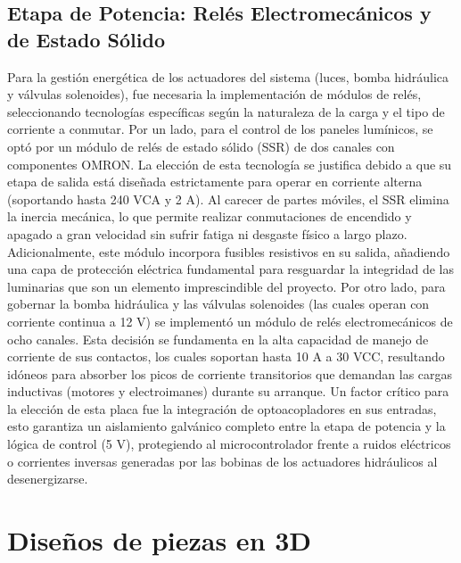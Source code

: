 \subsection{Etapa de Potencia: Relés Electromecánicos y de Estado Sólido}
Para la gestión energética de los actuadores del sistema (luces, bomba hidráulica y válvulas solenoides), fue necesaria la implementación de módulos de relés, seleccionando tecnologías específicas según la naturaleza de la carga y el tipo de corriente a conmutar.
Por un lado, para el control de los paneles lumínicos, se optó por un módulo de relés de estado sólido (SSR) de dos canales con componentes OMRON. La elección de esta tecnología se justifica debido a que su etapa de salida está diseñada estrictamente para operar en corriente alterna (soportando hasta 240 VCA y 2 A). Al carecer de partes móviles, el SSR elimina la inercia mecánica, lo que permite realizar conmutaciones de encendido y apagado a gran velocidad sin sufrir fatiga ni desgaste físico a largo plazo. Adicionalmente, este módulo incorpora fusibles resistivos en su salida, añadiendo una capa de protección eléctrica fundamental para resguardar la integridad de las luminarias que son un elemento imprescindible del proyecto.
Por otro lado, para gobernar la bomba hidráulica y las válvulas solenoides (las cuales operan con corriente continua a 12 V) se implementó un módulo de relés electromecánicos de ocho canales. Esta decisión se fundamenta en la alta capacidad de manejo de corriente de sus contactos, los cuales soportan hasta 10 A a 30 VCC, resultando idóneos para absorber los picos de corriente transitorios que demandan las cargas inductivas (motores y electroimanes) durante su arranque. Un factor crítico para la elección de esta placa fue la integración de optoacopladores en sus entradas, esto garantiza un aislamiento galvánico completo entre la etapa de potencia y la lógica de control (5 V), protegiendo al microcontrolador frente a ruidos eléctricos o corrientes inversas generadas por las bobinas de los actuadores hidráulicos al desenergizarse.

\section{Diseños de piezas en 3D} 

